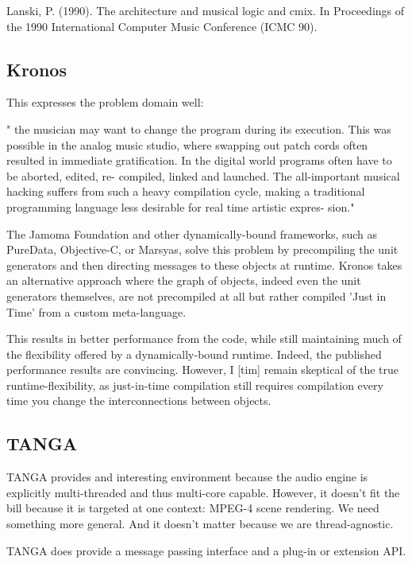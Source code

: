 \documentclass[twoside,10pt]{article}
\begin{document}
Lanski, P. (1990). The architecture and musical logic and cmix.
In Proceedings of the 1990 International Computer Music
Conference (ICMC 90).



\subsection{Kronos} %

This expresses the problem domain well:

" the musician may want to change the program during its execution. This was possible in the analog music studio, where swapping out patch cords often resulted in immediate gratification. In the digital world programs often have to be aborted, edited, re- compiled, linked and launched. The all-important musical hacking suffers from such a heavy compilation cycle, making a traditional programming language less desirable for real time artistic expres- sion." \cite{Norilo:2009}

The Jamoma Foundation and other dynamically-bound frameworks, such as PureData, Objective-C, or Marsyas, solve this problem by precompiling the unit generators and then directing messages to these objects at runtime.  Kronos takes an alternative approach where the graph of objects, indeed even the unit generators themselves, are not precompiled at all but rather compiled 'Just in Time' from a custom meta-language. 

This results in better performance from the code, while still maintaining much of the flexibility offered by a dynamically-bound runtime.  Indeed, the published performance results are convincing.  However, I [tim] remain skeptical of the true runtime-flexibility, as just-in-time compilation still requires compilation every time you change the interconnections between objects.


\subsection{TANGA} %

TANGA provides and interesting environment because the audio engine is explicitly multi-threaded and thus multi-core capable\cite{Reiter:2007}.  However, it doesn't fit the bill because it is targeted at one context: MPEG-4 scene rendering.  We need something more general.  And it doesn't matter because we are thread-agnostic.

TANGA does provide a message passing interface and a plug-in or extension API.
\end{document}
